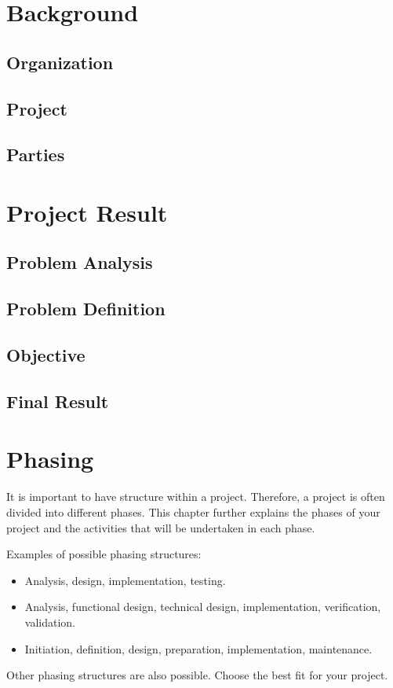\documentclass{article}
\begin{document}
\newpage

\tableofcontents

\newpage
\section{Background}
\subsection{Organization}
\subsection{Project}
\subsection{Parties}


\newpage
\section{Project Result}
\subsection{Problem Analysis}
\subsection{Problem Definition}
\subsection{Objective}
\subsection{Final Result}


\newpage
\section{Phasing}
It is important to have structure within a project. Therefore, a project is often divided into different phases. This chapter further explains the phases of your project and the activities that will be undertaken in each phase.

Examples of possible phasing structures:
\begin{itemize}
    \item Analysis, design, implementation, testing.
    \item Analysis, functional design, technical design, implementation, verification, validation.
    \item Initiation, definition, design, preparation, implementation, maintenance.
\end{itemize}
Other phasing structures are also possible. Choose the best fit for your project.
\end{document}
